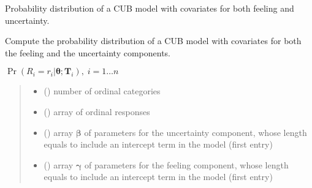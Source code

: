 \documentclass[letterpaper,10pt,english]{sphinxmanual}
\begin{document}
\begin{fulllineitems}
\label{\detokenize{cubmods:cubmods.cub_yw.prob}}
\pysigstartsignatures
{}
\pysigstopsignatures
\sphinxAtStartPar
Probability distribution of a CUB model with covariates for both feeling and uncertainty.

\sphinxAtStartPar
Compute the probability distribution of a CUB model with covariates for both the feeling 
and the uncertainty components.

\sphinxAtStartPar
\(\Pr(R_i=r_i|\pmb\theta;\pmb T_i),\; i=1 \ldots n\)
\begin{quote}\begin{description}
\begin{itemize}
\item {} 
\sphinxAtStartPar
{} () \textendash{} number of ordinal categories

\item {} 
\sphinxAtStartPar
{} () \textendash{} array of ordinal responses

\item {} 
\sphinxAtStartPar
{} () \textendash{} array \(\pmb \beta\) of parameters for the uncertainty component, whose length equals 
 to include an intercept term in the model (first entry)

\item {} 
\sphinxAtStartPar
{} () \textendash{} array \(\pmb \gamma\) of parameters for the feeling component, whose length equals 
 to include an intercept term in the model (first entry)


\end{itemize}
\end{description}
\end{quote}
\end{fulllineitems}
\end{document}
